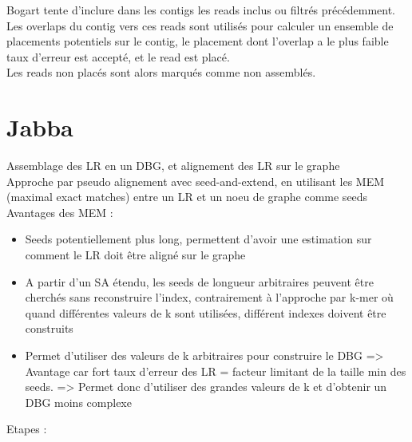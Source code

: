 \documentclass[12pt]{article}
\begin{document}
Bogart tente d'inclure dans les contigs les reads inclus ou filtrés précédemment. Les overlaps du contig vers ces reads sont utilisés pour calculer un ensemble de placements potentiels sur le contig, le placement dont l'overlap a le plus faible taux d'erreur est accepté, et le read est placé. \\

Les reads non placés sont alors marqués comme non assemblés.

\newpage

\section{Jabba}

Assemblage des LR en un DBG, et alignement des LR sur le graphe \\

Approche par pseudo alignement avec seed-and-extend, en utilisant les MEM (maximal exact matches) entre un LR et un noeu de graphe comme seeds \\

Avantages des MEM : \\

\begin{itemize}
	\item Seeds potentiellement plus long, permettent d'avoir une estimation sur comment le LR doit être aligné sur le graphe
	\item A partir d'un SA étendu, les seeds de longueur arbitraires peuvent être cherchés sans reconstruire l'index, contrairement
		  à l'approche par k-mer où quand différentes valeurs de k sont utilisées, différent indexes doivent être construits
	\item Permet d'utiliser des valeurs de k arbitraires pour construire le DBG => Avantage car fort taux d'erreur des LR = facteur limitant
		  de la taille min des seeds. => Permet donc d'utiliser des grandes valeurs de k et d'obtenir un DBG moins complexe
\end{itemize}

Etapes : \\
\end{document}
